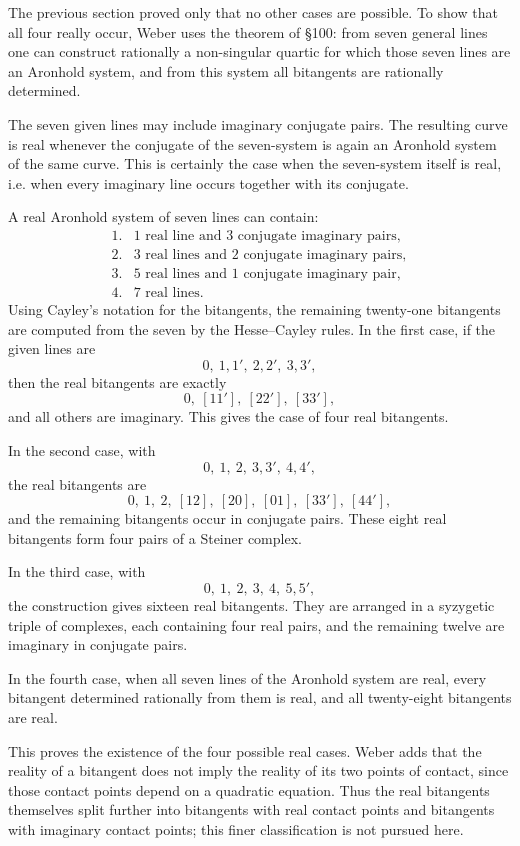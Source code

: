 \documentclass[11pt,a4paper]{book}
\begin{document}
The previous section proved only that no other cases are possible.  To show that all four really occur, Weber uses the theorem of §100: from seven general lines one can construct rationally a non-singular quartic for which those seven lines are an Aronhold system, and from this system all bitangents are rationally determined.

The seven given lines may include imaginary conjugate pairs.  The resulting curve is real whenever the conjugate of the seven-system is again an Aronhold system of the same curve.  This is certainly the case when the seven-system itself is real, i.e. when every imaginary line occurs together with its conjugate.

A real Aronhold system of seven lines can contain:
\[
\begin{array}{ll}
1.&1\text{ real line and }3\text{ conjugate imaginary pairs},\\
2.&3\text{ real lines and }2\text{ conjugate imaginary pairs},\\
3.&5\text{ real lines and }1\text{ conjugate imaginary pair},\\
4.&7\text{ real lines}.
\end{array}
\]
Using Cayley's notation for the bitangents, the remaining twenty-one bitangents are computed from the seven by the Hesse--Cayley rules.  In the first case, if the given lines are
\[
0,\ 1,1',\ 2,2',\ 3,3',
\]
then the real bitangents are exactly
\[
0,\ [11'],\ [22'],\ [33'],
\]
and all others are imaginary.  This gives the case of four real bitangents.

In the second case, with
\[
0,\ 1,\ 2,\ 3,3',\ 4,4',
\]
the real bitangents are
\[
0,\ 1,\ 2,\ [12],\ [20],\ [01],\ [33'],\ [44'],
\]
and the remaining bitangents occur in conjugate pairs.  These eight real bitangents form four pairs of a Steiner complex.

In the third case, with
\[
0,\ 1,\ 2,\ 3,\ 4,\ 5,5',
\]
the construction gives sixteen real bitangents.  They are arranged in a syzygetic triple of complexes, each containing four real pairs, and the remaining twelve are imaginary in conjugate pairs.

In the fourth case, when all seven lines of the Aronhold system are real, every bitangent determined rationally from them is real, and all twenty-eight bitangents are real.

This proves the existence of the four possible real cases.  Weber adds that the reality of a bitangent does not imply the reality of its two points of contact, since those contact points depend on a quadratic equation.  Thus the real bitangents themselves split further into bitangents with real contact points and bitangents with imaginary contact points; this finer classification is not pursued here.
\end{document}
